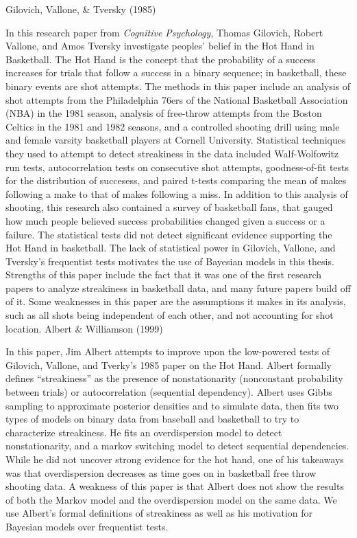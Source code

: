 \documentclass[12pt,twoside]{dukestatscithesis}
\theoremstyle{definition}
\theoremstyle{definition}
\theoremstyle{definition}
\theoremstyle{remark}
\begin{document}
Gilovich, Vallone, \& Tversky (1985)

In this research paper from \emph{Cognitive Psychology}, Thomas
Gilovich, Robert Vallone, and Amos Tversky investigate peoples' belief
in the Hot Hand in Basketball. The Hot Hand is the concept that the
probability of a success increases for trials that follow a success in a
binary sequence; in basketball, these binary events are shot attempts.
The methods in this paper include an analysis of shot attempts from the
Philadelphia 76ers of the National Basketball Association (NBA) in the
1981 season, analysis of free-throw attempts from the Boston Celtics in
the 1981 and 1982 seasons, and a controlled shooting drill using male
and female varsity basketball players at Cornell University. Statistical
techniques they used to attempt to detect streakiness in the data
included Walf-Wolfowitz run tests, autocorrelation tests on consecutive
shot attempts, goodness-of-fit tests for the distribution of succesess,
and paired t-tests comparing the mean of makes following a make to that
of makes following a miss. In addition to this analysis of shooting,
this research also contained a survey of basketball fans, that gauged
how much people believed success probabilities changed given a success
or a failure. The statistical tests did not detect significant evidence
supporting the Hot Hand in basketball. The lack of statistical power in
Gilovich, Vallone, and Tversky's frequentist tests motivates the use of
Bayesian models in this thesis. Strengths of this paper include the fact
that it was one of the first research papers to analyze streakiness in
basketball data, and many future papers build off of it. Some weaknesses
in this paper are the assumptions it makes in its analysis, such as all
shots being independent of each other, and not accounting for shot
location. Albert \& Williamson (1999)

In this paper, Jim Albert attempts to improve upon the low-powered tests
of Gilovich, Vallone, and Tverky's 1985 paper on the Hot Hand. Albert
formally defines ``streakiness'' as the presence of nonstationarity
(nonconstant probability between trials) or autocorrelation (sequential
dependency). Albert uses Gibbs sampling to approximate posterior
densities and to simulate data, then fits two types of models on binary
data from baseball and basketball to try to characterize streakiness. He
fits an overdispersion model to detect nonstationarity, and a markov
switching model to detect sequential dependencies. While he did not
uncover strong evidence for the hot hand, one of his takeaways was that
overdispersion decreases as time goes on in basketball free throw
shooting data. A weakness of this paper is that Albert does not show the
results of both the Markov model and the overdispersion model on the
same data. We use Albert's formal definitions of streakiness as well as
his motivation for Bayesian models over frequentist tests.
\end{document}
